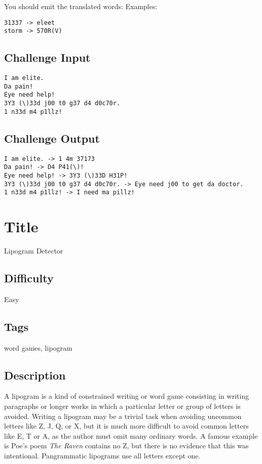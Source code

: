 You should emit the translated words: Examples:

\begin{verbatim}
31337 -> eleet
storm -> 570R(V)
\end{verbatim}

\subsection{Challenge Input}\label{challenge-input-24}

\begin{verbatim}
I am elite.
Da pain!
Eye need help!
3Y3 (\)33d j00 t0 g37 d4 d0c70r.
1 n33d m4 p1llz!
\end{verbatim}

\subsection{Challenge Output}\label{challenge-output-21}

\begin{verbatim}
I am elite. -> 1 4m 37173
Da pain! -> D4 P41(\)!
Eye need help! -> 3Y3 (\)33D H31P!
3Y3 (\)33d j00 t0 g37 d4 d0c70r. -> Eye need j00 to get da doctor.
1 n33d m4 p1llz! -> I need ma pillz!
\end{verbatim}

\section{Title}\label{title-31}

Lipogram Detector

\subsection{Difficulty}\label{difficulty-30}

Easy

\subsection{Tags}\label{tags-31}

word games, lipogram

\subsection{Description}\label{description-31}

A lipogram is a kind of constrained writing or word game consisting in
writing paragraphs or longer works in which a particular letter or group
of letters is avoided. Writing a lipogram may be a trivial task when
avoiding uncommon letters like Z, J, Q, or X, but it is much more
difficult to avoid common letters like E, T or A, as the author must
omit many ordinary words. A famous example is Poe's poem \emph{The
Raven} contains no Z, but there is no evidence that this was
intentional. Pangrammatic lipograms use all letters except one.

